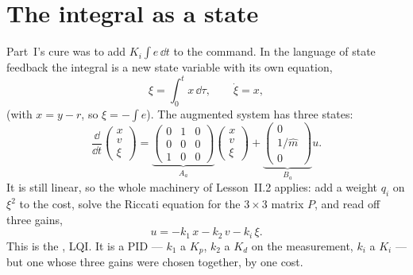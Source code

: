 \section{The integral as a state}

Part~I's cure was to add $K_i\int e\,\dd t$ to the command. In the language of state feedback the integral is a new state variable with its own equation,
\begin{equation}\label{eq:lqi-xi}
  \xi = \int_0^t x\,\dd\tau, \qquad \dot\xi = x ,
\end{equation}
(with $x = y - r$, so $\xi = -\int e$). The augmented system has three states:
\begin{equation}\label{eq:lqi-aug}
  \frac{\dd}{\dd t}\begin{pmatrix} x\\ v\\ \xi\end{pmatrix}
  = \underbrace{\begin{pmatrix} 0 & 1 & 0\\ 0 & 0 & 0\\ 1 & 0 & 0\end{pmatrix}}_{A_a}\begin{pmatrix} x\\ v\\ \xi\end{pmatrix}
  + \underbrace{\begin{pmatrix} 0\\ 1/\hat m\\ 0\end{pmatrix}}_{B_a} u .
\end{equation}
It is still linear, so the whole machinery of Lesson~II.2 applies: add a weight $q_i$ on $\xi^2$ to the cost, solve the Riccati equation for the $3 \times 3$ matrix $P$, and read off three gains,
\begin{equation}\label{eq:lqi-law}
  u = -k_1\,x - k_2\,v - k_i\,\xi .
\end{equation}
This is the , LQI. It is a PID — $k_1$ a $K_p$, $k_2$ a $K_d$ on the measurement, $k_i$ a $K_i$ — but one whose three gains were chosen together, by one cost.


